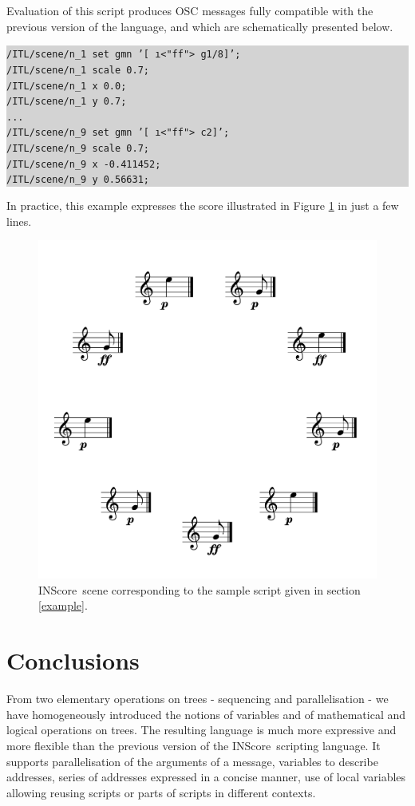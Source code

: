\documentclass[runningheads]{llncs}
\newcommand{\IS}		{INScore}
\newcommand{\code}	[2][0.9]	{\vspace{0mm}\begin{center}\colorbox{lightgrey}{
							\begin{minipage}[t]{#1\columnwidth} 
							{\small \texttt{#2}}
							\end{minipage}}\end{center}}
\begin{document}
Evaluation of this script produces OSC messages fully compatible with the previous version of the language, and which are schematically presented below. 
\code[1]{/ITL/scene/n\_1 set gmn '[ \i<"ff"> g1/8]';\\
/ITL/scene/n\_1 scale 0.7;\\
/ITL/scene/n\_1 x 0.0;\\
/ITL/scene/n\_1 y 0.7;\\
...\\
/ITL/scene/n\_9 set gmn '[ \i<"ff"> c2]';\\
/ITL/scene/n\_9 scale 0.7;\\
/ITL/scene/n\_9 x -0.411452;\\
/ITL/scene/n\_9 y 0.56631;
}
In practice, this example expresses the score illustrated in Figure \ref{samplescene} in just a few lines.  

\begin{figure}[htbp]
\begin{center}
\includegraphics[width=0.8\columnwidth]{imgs/scene}
\caption{\IS\ scene corresponding to the sample script given in section \ref{example}.}
\label{samplescene}
\end{center}
\end{figure}


\section{Conclusions}
From two elementary operations on trees - sequencing and parallelisation - we have homogeneously introduced the notions of variables and of mathematical and logical operations on trees. The resulting language is much more expressive and more flexible than the  previous version of the \IS\ scripting language. 
It supports parallelisation of the arguments of a message, variables to describe addresses, series of addresses expressed in a concise manner, use of local variables allowing reusing scripts or parts of scripts in different contexts.



\balance


\end{document}
